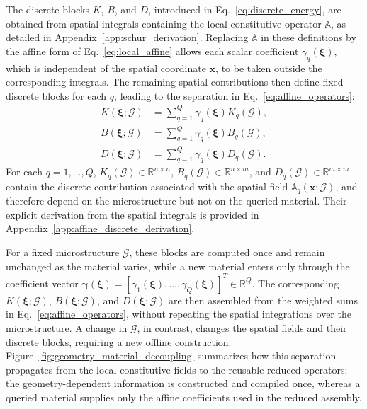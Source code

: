 \documentclass[pdflatex,sn-basic,Numbered]{sn-jnl}
\newcommand{\R}{\mathbb{R}}
\newcommand{\G}{\mathcal{G}}
\begin{document}
The discrete blocks \(K\), \(B\), and \(D\), introduced in
Eq.~\eqref{eq:discrete_energy}, are obtained from spatial integrals containing
the local constitutive operator \(\mathbb A\), as detailed in
Appendix~\ref{app:schur_derivation}. Replacing \(\mathbb A\) in these
definitions by the affine form of Eq.~\eqref{eq:local_affine} allows each
scalar coefficient \(\gamma_q(\boldsymbol\xi)\), which is independent of the
spatial coordinate \(\boldsymbol x\), to be taken outside the corresponding
integrals. The remaining spatial contributions then define fixed discrete
blocks for each \(q\), leading to the separation in
Eq.~\eqref{eq:affine_operators}:
\begin{equation}
\label{eq:affine_operators}
\begin{aligned}
K(\boldsymbol\xi;\G)
&=
\sum_{q=1}^{Q}
\gamma_q(\boldsymbol\xi)K_q(\G),\\
B(\boldsymbol\xi;\G)
&=
\sum_{q=1}^{Q}
\gamma_q(\boldsymbol\xi)B_q(\G),\\
D(\boldsymbol\xi;\G)
&=
\sum_{q=1}^{Q}
\gamma_q(\boldsymbol\xi)D_q(\G).
\end{aligned}
\end{equation}
For each \(q=1,\ldots,Q\),
\(K_q(\G)\in\R^{n\times n}\),
\(B_q(\G)\in\R^{n\times m}\), and
\(D_q(\G)\in\R^{m\times m}\) contain the discrete contribution associated
with the spatial field \(\mathbb A_q(\boldsymbol x;\G)\), and therefore
depend on the microstructure but not on the queried material. Their explicit
derivation from the spatial integrals is provided in
Appendix~\ref{app:affine_discrete_derivation}.

For a fixed microstructure \(\G\), these blocks are computed once and remain
unchanged as the material varies, while a new material enters only through
the coefficient vector
\(\boldsymbol\gamma(\boldsymbol\xi)
=
[\gamma_1(\boldsymbol\xi),\ldots,\gamma_Q(\boldsymbol\xi)]^T
\in\R^Q\). The corresponding
\(K(\boldsymbol\xi;\G)\),
\(B(\boldsymbol\xi;\G)\), and
\(D(\boldsymbol\xi;\G)\) are then assembled from the weighted sums in
Eq.~\eqref{eq:affine_operators}, without repeating the spatial integrations
over the microstructure. A change in \(\G\), in contrast, changes the spatial
fields and their discrete blocks, requiring a new offline construction.
Figure~\ref{fig:geometry_material_decoupling} summarizes how this separation
propagates from the local constitutive fields to the reusable reduced
operators: the geometry-dependent information is constructed and compiled
once, whereas a queried material supplies only the affine coefficients used
in the reduced assembly.
\end{document}

